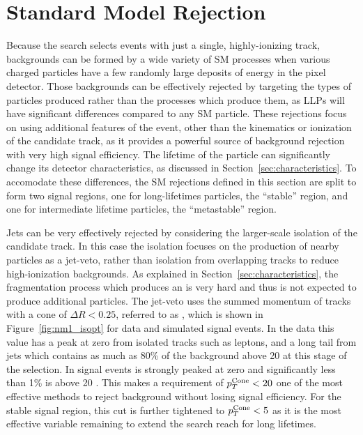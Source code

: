 
\section{Standard Model Rejection}
\label{sec:sm_rejection}

Because the search selects events with just a single, highly-ionizing track, backgrounds can be formed by a wide variety of \ac{SM} processes when various charged particles have a few randomly large deposits of energy in the pixel detector.
Those backgrounds can be effectively rejected by targeting the types of particles produced rather than the processes which produce them, as \acp{LLP} will have significant differences compared to any \ac{SM} particle.
These rejections focus on using additional features of the event, other than the kinematics or ionization of the candidate track, as it provides a powerful source of background rejection with very high signal efficiency.
The lifetime of the particle can significantly change its detector characteristics, as discussed in Section~\ref{sec:characteristics}.
To accomodate these differences, the \ac{SM} rejections defined in this section are split to form two signal regions, one for long-lifetimes particles, the ``stable'' region, and one for intermediate lifetime particles, the ``metastable'' region.

Jets can be very effectively rejected by considering the larger-scale isolation of the candidate track.
In this case the isolation focuses on the production of nearby particles as a jet-veto, rather than isolation from overlapping tracks to reduce high-ionization backgrounds.
As explained in Section~\ref{sec:characteristics}, the fragmentation process which produces an \rhadron is very hard and thus is not expected to produce additional particles.
The jet-veto uses the summed momentum of tracks with a cone of $\Delta R < 0.25$, referred to as \ptcone, which is shown in Figure~\ref{fig:nm1_isopt} for data and simulated signal events. 
In the data this value has a peak at zero from isolated tracks such as leptons, and a long tail from jets which contains as much as 80\% of the background above 20 \GeV at this stage of the selection.
In signal events \ptcone is strongly peaked at zero and significantly less than 1\% is above 20 \GeV. 
This makes a requirement of $p_T^\mathrm{Cone} < 20$ \GeV one of the most effective methods to reject background without losing signal efficiency.
For the stable signal region, this cut is further tightened to $p_T^\mathrm{Cone} < 5$ \GeV as it is the most effective variable remaining to extend the search reach for long lifetimes. 


